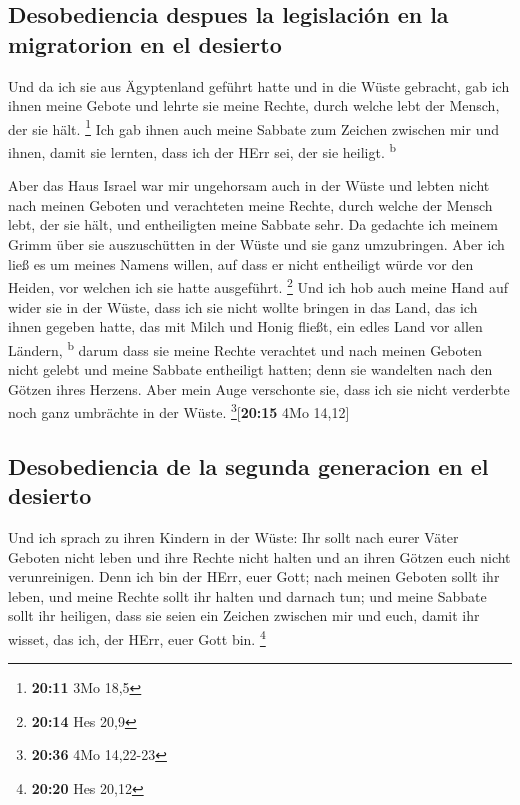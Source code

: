 \hypertarget{desobediencia-despues-la-legislaciuxf3n-en-la-migratorion-en-el-desierto}{%
\subsection{Desobediencia despues la legislación en la migratorion en el
desierto}\label{desobediencia-despues-la-legislaciuxf3n-en-la-migratorion-en-el-desierto}}

 Und da ich sie aus Ägyptenland geführt hatte und in die
Wüste gebracht,  gab ich ihnen meine Gebote und lehrte
sie meine Rechte, durch welche lebt der Mensch, der sie hält.
\footnote{\textbf{20:11} 3Mo 18,5}  Ich gab ihnen auch
meine Sabbate zum Zeichen zwischen mir und ihnen, damit sie lernten,
dass ich der HErr sei, der sie heiligt. \textsuperscript{b}

 Aber das Haus Israel war mir ungehorsam auch in der
Wüste und lebten nicht nach meinen Geboten und verachteten meine Rechte,
durch welche der Mensch lebt, der sie hält, und entheiligten meine
Sabbate sehr. Da gedachte ich meinem Grimm über sie auszuschütten in der
Wüste und sie ganz umzubringen.  Aber ich ließ es um
meines Namens willen, auf dass er nicht entheiligt würde vor den Heiden,
vor welchen ich sie hatte ausgeführt. \footnote{\textbf{20:14} Hes 20,9}
 Und ich hob auch meine Hand auf wider sie in der Wüste,
dass ich sie nicht wollte bringen in das Land, das ich ihnen gegeben
hatte, das mit Milch und Honig fließt, ein edles Land vor allen Ländern,
\textsuperscript{b}  darum dass sie meine Rechte
verachtet und nach meinen Geboten nicht gelebt und meine Sabbate
entheiligt hatten; denn sie wandelten nach den Götzen ihres Herzens.
 Aber mein Auge verschonte sie, dass ich sie nicht
verderbte noch ganz umbrächte in der Wüste. \footnote{\textbf{20:36} 4Mo
  14,22-23}{[}\textbf{20:15} 4Mo 14,12{]}

\hypertarget{desobediencia-de-la-segunda-generacion-en-el-desierto}{%
\subsection{Desobediencia de la segunda generacion en el
desierto}\label{desobediencia-de-la-segunda-generacion-en-el-desierto}}

 Und ich sprach zu ihren Kindern in der Wüste: Ihr sollt
nach eurer Väter Geboten nicht leben und ihre Rechte nicht halten und an
ihren Götzen euch nicht verunreinigen.  Denn ich bin der
HErr, euer Gott; nach meinen Geboten sollt ihr leben, und meine Rechte
sollt ihr halten und darnach tun;  und meine Sabbate
sollt ihr heiligen, dass sie seien ein Zeichen zwischen mir und euch,
damit ihr wisset, das ich, der HErr, euer Gott bin. \footnote{\textbf{20:20}
  Hes 20,12}

